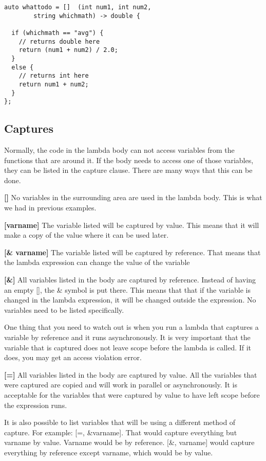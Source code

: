 \begin{lstlisting}
auto whattodo = []  (int num1, int num2,  
        string whichmath) -> double {

  if (whichmath == "avg") {
    // returns double here
    return (num1 + num2) / 2.0;
  } 
  else {
    // returns int here
    return num1 + num2;
  }
};
\end{lstlisting}

\subsection{Captures}
Normally, the code in the lambda body can not access variables from the
functions that are around it. If the body needs to access one of those variables,
they can be listed in the capture clause. There are many ways that this can be done.

 \textbf{[]} No variables in the surrounding area are used in the lambda body. This is what we had in previous examples.
 
 \textbf{[varname]} The variable listed will be captured by value. This means that it will make a copy of the value where it can be used later.
 
 \textbf{[\& varname]} The variable listed will be captured by reference. That means that the lambda
 expression can change the value of the variable
 
 \textbf{[\&]} All variables listed in the body are captured by reference. Instead of having an empty [], the \& symbol is put there. This means that 
that if the variable is changed in the lambda expression, it will be changed outside the expression. No variables need to be listed specifically.

One thing that you need to watch out is when you run a lambda that captures a variable by reference and it runs asynchronously. It is very important that the variable that is captured does not leave scope before the lambda is called. If it does, you may get an access violation error.

 \textbf{[=]} All variables listed in the body are captured by value. All the variables that were captured are copied and will work in parallel or asynchronously. It is acceptable for the variables that were captured by value to have left scope before the expression runs.
 
 It is also possible to list variables that will be using a different method of capture. For example: [=, \&varname]. That would capture everything but varname by value. Varname would be by reference. [\&, varname] would capture everything by reference except varname, which 
 would be by value.


